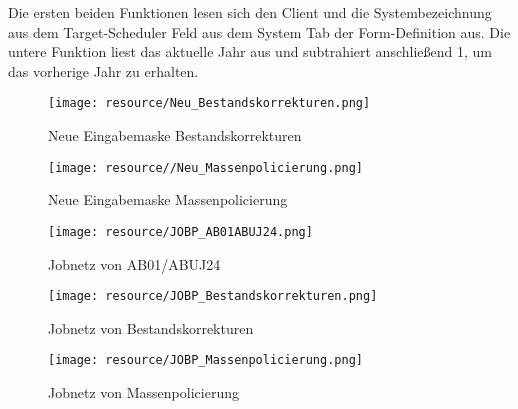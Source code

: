 			Die ersten beiden Funktionen lesen sich den Client und die Systembezeichnung aus dem Target-Scheduler Feld aus dem System Tab der Form-Definition aus. Die untere Funktion liest das aktuelle Jahr aus und subtrahiert anschließend 1, um das vorherige Jahr zu erhalten.
	
		\begin{figure}[H]
			\centering
			\texttt{[image: resource/Neu\_Bestandskorrekturen.png]}
			\caption{Neue Eingabemaske Bestandskorrekturen}
			\label{fig:Neu_Bestandskorrekturen}		
		\end{figure}
		
		\begin{figure}[H]
			\centering
			\texttt{[image: resource//Neu\_Massenpolicierung.png]}
			\caption{Neue Eingabemaske Massenpolicierung}
			\label{fig:Neu_Massenpolicierung}		
		\end{figure}
	
		\begin{figure}[H]
			\centering
			\texttt{[image: resource/JOBP\_AB01ABUJ24.png]}
			\caption{Jobnetz von AB01/ABUJ24}
			\label{fig:JOBP_AB01ABUJ24}		
		\end{figure}
		
		\begin{figure}[H]
			\centering
			\texttt{[image: resource/JOBP\_Bestandskorrekturen.png]}
			\caption{Jobnetz von Bestandskorrekturen}
			\label{fig:JOBP_Bestandskorrekturen}		
		\end{figure}	
		
		\begin{figure}[H]
			\centering
			\texttt{[image: resource/JOBP\_Massenpolicierung.png]}
			\caption{Jobnetz von Massenpolicierung}
			\label{fig:JOBP_Massenpolicierung}		
		\end{figure}
